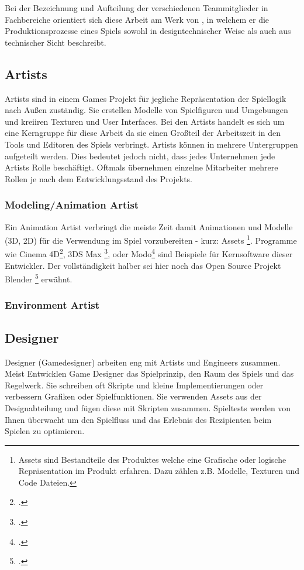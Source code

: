 \documentclass[pagesize, paper=a4, fontsize=12pt,titlepage=true, headings=small, headnosepline, abstractoff, liststotoc, nochapterprefix, plainheadsepline, twoside]{scrreprt}
\begin{document}
Bei der Bezeichnung und Aufteilung der verschiedenen Teammitglieder in Fachbereiche orientiert sich diese Arbeit am Werk von , in welchem er die Produktionsprozesse eines Spiels sowohl in designtechnischer Weise als auch aus technischer Sicht beschreibt.

\subsection{Artists}
Artists sind in einem Games Projekt für jegliche Repräsentation der Spiellogik nach Außen zuständig. Sie erstellen Modelle von Spielfiguren und Umgebungen und kreiiren Texturen und User Interfaces. Bei den Artists handelt es sich um eine Kerngruppe für diese Arbeit da sie einen Großteil der Arbeitszeit in den Tools und Editoren des Spiels verbringt. Artists können in mehrere Untergruppen aufgeteilt werden. Dies bedeutet jedoch nicht, dass jedes Unternehmen jede Artists Rolle beschäftigt. Oftmals übernehmen einzelne Mitarbeiter mehrere Rollen je nach dem Entwicklungsstand des Projekts.
\subsubsection{Modeling/Animation Artist}
Ein Animation Artist verbringt die meiste Zeit damit Animationen und Modelle (3D, 2D) für die Verwendung im Spiel vorzubereiten - kurz: Assets \footnote{Assets sind Bestandteile des Produktes welche eine Grafische oder logische Repräsentation im Produkt erfahren. Dazu zählen z.B. Modelle, Texturen und Code Dateien.}. Programme wie Cinema 4D\footcite{MaxonC4d2014}, 3DS Max \footcite{AutodeskMax2014}, oder Modo\footcite{FoundryModo2014} sind Beispiele für Kernsoftware dieser Entwickler. Der vollständigkeit halber sei hier noch das Open Source Projekt Blender \footcite{Blender2015} erwähnt.

\subsubsection{Environment Artist}

\subsection{Designer}
Designer (Gamedesigner) arbeiten eng mit Artists und Engineers zusammen. Meist Entwicklen Game Designer das Spielprinzip, den Raum des Spiels und das Regelwerk. Sie schreiben oft Skripte und kleine Implementierungen oder verbessern Grafiken oder Spielfunktionen. Sie verwenden Assets aus der Designabteilung und fügen diese mit Skripten zusammen. Spieltests werden von Ihnen überwacht um den Spielfluss und das Erlebnis des Rezipienten beim Spielen zu optimieren.
\end{document}
